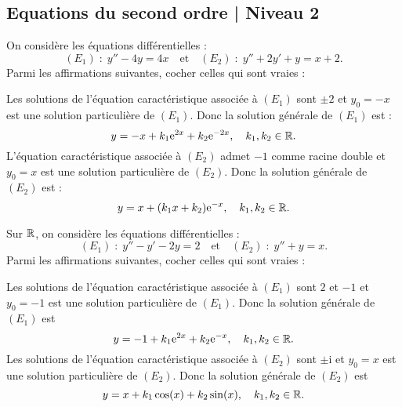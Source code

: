 \subsection{Equations du second ordre | Niveau 2}

\begin{question}
On considère les équations différentielles :
$$(E_1)\; :\; y''-4y=4x\quad \mbox{et}\quad (E_2)\; :\; y''+2y'+y=x+2.$$
Parmi les affirmations suivantes, cocher celles qui sont vraies :
\begin{answers}  
\end{answers}
\begin{explanations}
Les solutions de l'équation caractéristique associée à $(E_1)$ sont $\pm 2$ et $y_0=-x$ est une solution particulière de $(E_1)$. Donc la solution générale de $(E_1)$ est :
$$y=-x+k_1\mathrm{e}^{2x}+k_2\mathrm{e}^{-2x},\quad k_1,k_2\in \mathbb{R}.$$
L'équation caractéristique associée à $(E_2)$ admet $-1$ comme racine double et $y_0=x$ est une solution particulière de $(E_2)$. Donc la solution générale de $(E_2)$ est :
$$y=x+(k_1x+k_2)\mathrm{e}^{-x},\quad k_1,k_2\in \mathbb{R}.$$
\end{explanations}
\end{question}

\begin{question}
Sur $\mathbb{R}$, on considère les équations différentielles :
$$(E_1)\; :\; y''-y'-2y=2\quad \mbox{et}\quad (E_2)\; :\; y''+y=x.$$
Parmi les affirmations suivantes, cocher celles qui sont vraies :
\begin{answers}  
\end{answers}
\begin{explanations}
Les solutions de l'équation caractéristique associée à $(E_1)$ sont $2$ et $-1$ et $y_0=-1$ est une solution particulière de $(E_1)$. Donc la solution générale de $(E_1)$ est
$$y=-1+k_1\mathrm{e}^{2x}+k_2\mathrm{e}^{-x},\quad k_1,k_2\in \mathbb{R}.$$
Les solutions de l'équation caractéristique associée à $(E_2)$ sont $\pm \mathrm{i}$ et $y_0=x$ est une solution particulière de $(E_2)$. Donc la solution générale de $(E_2)$ est
$$y=x+k_1\cos (x)+k_2\sin (x),\quad k_1,k_2\in \mathbb{R}.$$
\end{explanations}
\end{question}

